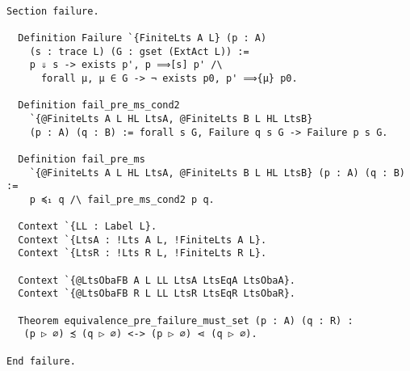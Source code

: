 \begin{mdframed}
\begin{verbatim}

Section failure.

  Definition Failure `{FiniteLts A L} (p : A)
    (s : trace L) (G : gset (ExtAct L)) :=
    p ⇓ s -> exists p', p ⟹[s] p' /\
      forall μ, μ ∈ G -> ¬ exists p0, p' ⟹{μ} p0.

  Definition fail_pre_ms_cond2
    `{@FiniteLts A L HL LtsA, @FiniteLts B L HL LtsB}
    (p : A) (q : B) := forall s G, Failure q s G -> Failure p s G.

  Definition fail_pre_ms
    `{@FiniteLts A L HL LtsA, @FiniteLts B L HL LtsB} (p : A) (q : B) :=
    p ≼₁ q /\ fail_pre_ms_cond2 p q.

  Context `{LL : Label L}.
  Context `{LtsA : !Lts A L, !FiniteLts A L}.
  Context `{LtsR : !Lts R L, !FiniteLts R L}.

  Context `{@LtsObaFB A L LL LtsA LtsEqA LtsObaA}.
  Context `{@LtsObaFB R L LL LtsR LtsEqR LtsObaR}.

  Theorem equivalence_pre_failure_must_set (p : A) (q : R) :
   (p ▷ ∅) ≾ (q ▷ ∅) <-> (p ▷ ∅) ⋖ (q ▷ ∅).

End failure.
\end{verbatim}
\end{mdframed}
